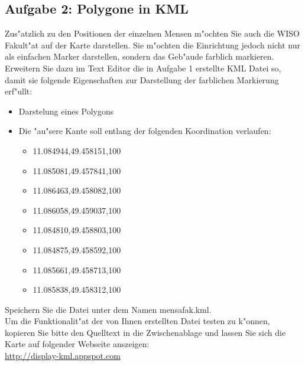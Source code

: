 


\subsection{Aufgabe 2: Polygone in KML}
Zus"atzlich zu den Positionen der einzelnen Mensen m"ochten Sie auch die WISO Fakult"at auf der Karte darstellen.
Sie m"ochten die Einrichtung jedoch nicht nur als einfachen Marker darstellen, sondern das Geb"aude farblich markieren.\\
Erweitern Sie dazu im Text Editor die in Aufgabe 1 erstellte KML Datei so, damit sie folgende Eigenschaften zur Darstellung der farblichen Markierung erf"ullt:
\begin{itemize}
    \item Darstelung eines Polygons
    \item Die "au"sere Kante soll entlang der folgenden Koordination verlaufen:
    \begin{itemize}
        \item 11.084944,49.458151,100
        \item 11.085081,49.457841,100
        \item 11.086463,49.458082,100
        \item 11.086058,49.459037,100
        \item 11.084810,49.458803,100
        \item 11.084875,49.458592,100
        \item 11.085661,49.458713,100
        \item 11.085838,49.458312,100
    \end{itemize}
\end{itemize}
Speichern Sie die Datei unter dem Namen mensafak.kml.\\
Um die Funktionalit"at der von Ihnen erstellten Datei testen zu k"onnen, kopieren Sie bitte den Quelltext in die Zwischenablage und lassen Sie sich die Karte auf folgender Webseite anszeigen:\\ 
\url{http://display-kml.appspot.com}









